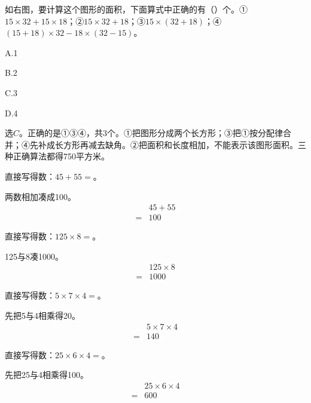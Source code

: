 如右图，要计算这个图形的面积，下面算式中正确的有（\hspace{1.8em}）个。①\(15\times32+15\times18\)；②\(15\times32+18\)；③\(15\times(32+18)\)；④\((15+18)\times32-18\times(32-15)\)。\par
\noindent A.1\par
\noindent B.2\par
\noindent C.3\par
\noindent D.4\par
{}
\begin{BookAnswer}
选\(C\)。正确的是①③④，共3个。①把图形分成两个长方形；③把①按分配律合并；④先补成长方形再减去缺角。②把面积和长度相加，不能表示该图形面积。三种正确算法都得750平方米。
\end{BookAnswer}

直接写得数：\(45+55=\)。\par
\begin{BookAnswer}
两数相加凑成100。\[\begin{aligned} &45+55\\={}&100\end{aligned}\]
\end{BookAnswer}

直接写得数：\(125\times8=\)。\par
\begin{BookAnswer}
125与8凑1000。\[\begin{aligned} &125\times8\\={}&1000\end{aligned}\]
\end{BookAnswer}

直接写得数：\(5\times7\times4=\)。\par
\begin{BookAnswer}
先把5与4相乘得20。\[\begin{aligned} &5\times7\times4\\={}&140\end{aligned}\]
\end{BookAnswer}

直接写得数：\(25\times6\times4=\)。\par
\begin{BookAnswer}
先把25与4相乘得100。\[\begin{aligned} &25\times6\times4\\={}&600\end{aligned}\]
\end{BookAnswer}

